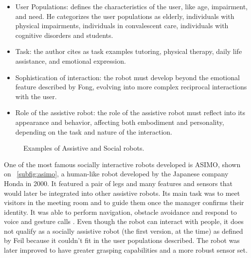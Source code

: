 \begin{itemize}
    \item User Populations: defines the characteristics of the user, like age, impairment, and need. He categorizes the user populations as elderly, individuals with physical impairments, individuals in convalescent care, individuals with cognitive disorders and students.
    \item Task: the author cites as task examples tutoring, physical therapy, daily life assistance, and emotional expression.
    \item Sophistication of interaction: the robot must develop beyond the emotional feature described by Fong, evolving into more complex reciprocal interactions with the user.
    \item Role of the assistive robot: the role of the assistive robot must reflect into its appearance and behavior, affecting both embodiment and personality, depending on the task and nature of the interaction.
\end{itemize}


\begin{figure}[!ht]
     \centering
     \hspace{0.3cm}
     \hspace{0.3cm}
     \caption{Examples of Assistive and Social robots.}
     \label{fig:social-assistive-robots}
\end{figure}

One of the most famous socially interactive robots developed is ASIMO, shown on \figurename~\ref{subfig:asimo}, a human-like robot developed by the Japanese company Honda in 2000. It featured a pair of legs and many features and sensors that would later be integrated into other assistive robots. Its main task was to meet visitors in the meeting room and to guide them once the manager confirms their identity. It was able to perform navigation, obstacle avoidance and respond to voice and gesture calls \cite{sakagami2002intelligent}. Even though the robot can interact with people, it does not qualify as a socially assistive robot (the first version, at the time) as defined by Feil because it couldn't fit in the user populations described. The robot was later improved to have greater grasping capabilities and a more robust sensor set.

